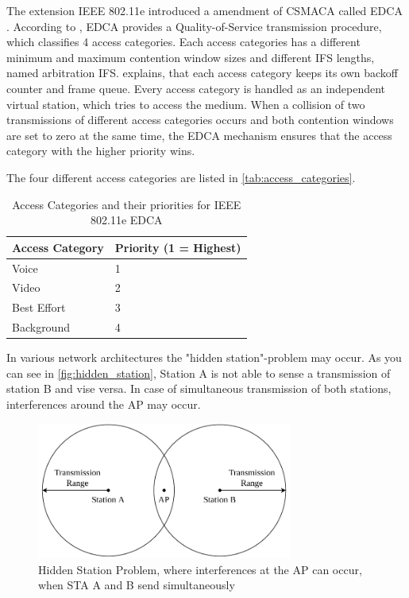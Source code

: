 The extension IEEE 802.11e introduced a amendment of \ac{CSMACA} called \ac{EDCA} \cite{sommer_vehicular_2014} \cite{wu_ieee_2006}.
According to \textcite{sommer_vehicular_2014}, \ac{EDCA} provides a Quality-of-Service transmission procedure, which classifies \num{4} access categories.
Each access categories has a different minimum and maximum contention window sizes and different \ac{IFS} lengths, named
arbitration \ac{IFS}.
\textcite{wu_ieee_2006} explains, that each access category keeps its own backoff counter and frame queue.
Every access category is handled as an independent virtual station, which tries to access the medium.
When a collision of
two transmissions of different access categories occurs and both contention windows are set to zero at the same time,
the \ac{EDCA} mechanism ensures that the access category with the higher priority wins.

The four different access categories are listed in \autoref{tab:access_categories}.

\begin{table}[!ht]
	\centering
	\begin{tabular}{>{\raggedright}p{2.5cm}p{3.2cm}}
		\toprule
		Access Category & Priority (1 = Highest)\\
		\midrule
		Voice & 1 \\
		Video & 2 \\
		Best Effort & 3 \\
		Background & 4 \\
		\bottomrule
	\end{tabular}
	\caption{Access Categories and their priorities for IEEE 802.11e \ac{EDCA} \cite{wu_ieee_2006}}
	\label{tab:access_categories}
\end{table}



In various network architectures the "hidden station"-problem may occur.
As you can see in \autoref{fig:hidden_station}, Station A is not able to sense a transmission of station B and vise versa.
In case of simultaneous transmission of both stations, interferences around the \ac{AP} may occur.
\begin{figure}%
	\centering
	\includegraphics[width=0.75\textwidth]{figures/hidden_station.pdf}
	\caption{Hidden Station Problem, where interferences at the \acf{AP} can occur, when \acf{STA} A and B send simultaneously}%
	\label{fig:hidden_station}%
\end{figure}


